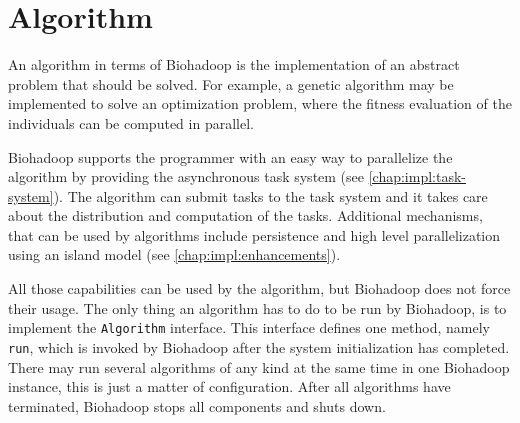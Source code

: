 % 
%   
%   
\section{Algorithm}
\label{chap:impl:algorithm}
An algorithm in terms of Biohadoop is the implementation of an abstract problem that should be solved. For example, a genetic algorithm may be implemented to solve an optimization problem, where the fitness evaluation of the individuals can be computed in parallel.

Biohadoop supports the programmer with an easy way to parallelize the algorithm by providing the asynchronous task system (see \ref{chap:impl:task-system}). The algorithm can submit tasks to the task system and it takes care about the distribution and computation of the tasks. Additional mechanisms, that can be used by algorithms include persistence and high level parallelization using an island model (see \ref{chap:impl:enhancements}).

All those capabilities can be used by the algorithm, but Biohadoop does not force their usage. The only thing an algorithm has to do to be run by Biohadoop, is to implement the \texttt{Algorithm} interface. This interface defines one method, namely \texttt{run}, which is invoked by Biohadoop after the system initialization has completed. There may run several algorithms of any kind at the same time in one Biohadoop instance, this is just a matter of configuration. After all algorithms have terminated, Biohadoop stops all components and shuts down.

